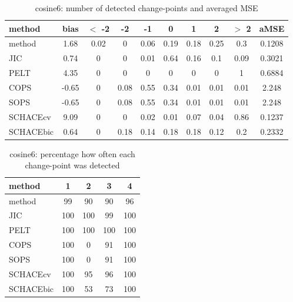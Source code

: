 \begin{table}[ht]
\centering
\begin{tabular}{l|c|ccccccc|c}
  \hline
method & bias & $<$ -2 & -2 & -1 & 0 & 1 & 2 & $>$ 2 & aMSE \\ 
  \hline
method &  1.68 &  0.02 &     0 &  0.06 &  0.19 &  0.18 &  0.25 &   0.3 & 0.1208 \\ 
  JIC &  0.74 &     0 &     0 &  0.01 &  0.64 &  0.16 &   0.1 &  0.09 & 0.3021 \\ 
  PELT &  4.35 &     0 &     0 &     0 &     0 &     0 &     0 &     1 & 0.6884 \\ 
  COPS & -0.65 &     0 &  0.08 &  0.55 &  0.34 &  0.01 &  0.01 &  0.01 & 2.248 \\ 
  SOPS & -0.65 &     0 &  0.08 &  0.55 &  0.34 &  0.01 &  0.01 &  0.01 & 2.248 \\ 
  SCHACEcv &  9.09 &     0 &     0 &  0.02 &  0.01 &  0.07 &  0.04 &  0.86 & 0.1237 \\ 
  SCHACEbic &  0.64 &     0 &  0.18 &  0.14 &  0.18 &  0.18 &  0.12 &   0.2 & 0.2332 \\ 
   \hline
\end{tabular}
\caption{cosine6: number of detected change-points and averaged MSE} 
\label{tab:cosine6Njumps}
\end{table}
\begin{table}[ht]
\centering
\begin{tabular}{l|cccc}
  \hline
method & 1 & 2 & 3 & 4 \\ 
  \hline
method &     99 &     90 &     90 &     96 \\ 
  JIC &    100 &    100 &     99 &    100 \\ 
  PELT &    100 &    100 &    100 &    100 \\ 
  COPS &    100 &      0 &     91 &    100 \\ 
  SOPS &    100 &      0 &     91 &    100 \\ 
  SCHACEcv &    100 &     95 &     96 &    100 \\ 
  SCHACEbic &    100 &     53 &     73 &    100 \\ 
   \hline
\end{tabular}
\caption{cosine6: percentage how often each change-point was detected} 
\label{tab:cosine6Detections}
\end{table}
